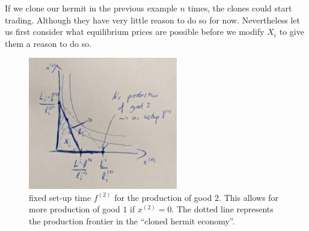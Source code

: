 \begin{example}
	If we clone our hermit in the previous example \(n\) times, the clones could
	start trading. Although they have very little reason to do so for now.
	Nevertheless let us first consider what equilibrium prices are possible
	before we modify \(X_i\) to give them a reason to do so.
\end{example}

\begin{figure}
	\includegraphics[width=0.58\textwidth]{images/hermit-decision-setup-cost.jpeg}
	\caption{
	fixed set-up time \(f^{(2)}\) for the production of good \(2\). This allows
	for more production of good \(1\) if \(x^{(2)}=0\). The dotted line
	represents the production frontier in the ``cloned hermit economy''.}
\end{figure}